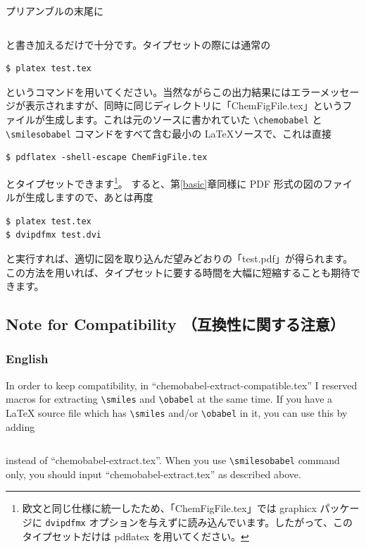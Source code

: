 \documentclass[12pt]{jsarticle}
\begin{document}
プリアンブルの末尾に
\begin{verbatim}

\end{verbatim}
と書き加えるだけで十分です。タイプセットの際には通常の
\begin{verbatim}
$ platex test.tex
\end{verbatim}
というコマンドを用いてください。当然ながらこの出力結果にはエラーメッセージが表示されますが、同時に同じディレクトリに「ChemFigFile.tex」というファイルが生成します。これは元のソースに書かれていた \verb|\chemobabel| と \verb|\smilesobabel| コマンドをすべて含む最小の \LaTeX ソースで、これは直接
\begin{verbatim}
$ pdflatex -shell-escape ChemFigFile.tex
\end{verbatim}
とタイプセットできます\footnote{欧文と同じ仕様に統一したため、「ChemFigFile.tex」では \textsf{graphicx} パッケージに \texttt{dvipdfmx} オプションを与えずに読み込んでいます。したがって、このタイプセットだけは pdflatex を用いてください。}。
すると、第\ref{basic}章同様に PDF 形式の図のファイルが生成しますので、あとは再度
\begin{verbatim}
$ platex test.tex
$ dvipdfmx test.dvi
\end{verbatim}
と実行すれば、適切に図を取り込んだ望みどおりの「test.pdf」が得られます。
この方法を用いれば、タイプセットに要する時間を大幅に短縮することも期待できます。

\clearpage

\subsection{Note for Compatibility （互換性に関する注意）}

\subsubsection{English}

In order to keep compatibility, in ``chemobabel-extract-compatible.tex'' I reserved macros for extracting \verb|\smiles| and \verb|\obabel| at the same time.
If you have a {\LaTeX} source file which has \verb|\smiles| and/or \verb|\obabel| in it, you can use this by adding
\begin{verbatim}

\end{verbatim}
instead of ``chemobabel-extract.tex''.
When you use \verb|\smilesobabel| command only, you should input ``chemobabel-extract.tex'' as described above.
\end{document}
